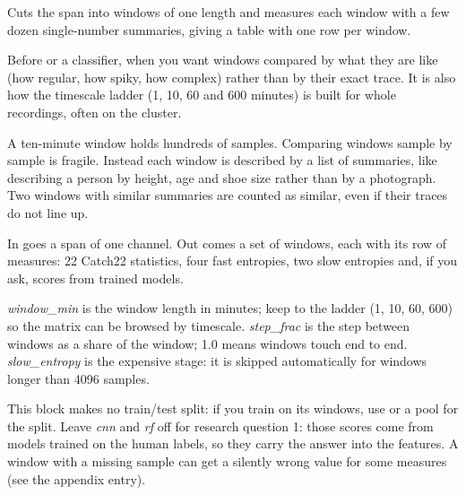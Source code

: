 Cuts the span into windows of one length and measures each window with a few dozen
single-number summaries, giving a table with one row per window.

Before  or a classifier, when you want windows compared by what
they are like (how regular, how spiky, how complex) rather than by their exact trace. It is
also how the timescale ladder (1, 10, 60 and 600 minutes) is built for whole recordings,
often on the cluster.

\begin{plainterms}
A ten-minute window holds hundreds of samples. Comparing windows sample by sample is fragile.
Instead each window is described by a list of summaries, like describing a person by height,
age and shoe size rather than by a photograph. Two windows with similar summaries are
counted as similar, even if their traces do not line up.
\end{plainterms}

In goes a span of one channel. Out comes a set of windows, each with its row of measures:
22 Catch22 statistics, four fast entropies, two slow entropies and, if you ask, scores from
trained models.

\emph{window\_min} is the window length in minutes; keep to the ladder (1, 10, 60, 600) so the
matrix can be browsed by timescale. \emph{step\_frac} is the step between windows as a share
of the window; 1.0 means windows touch end to end. \emph{slow\_entropy} is the expensive
stage: it is skipped automatically for windows longer than 4096 samples.

This block makes no train/test split: if you train on its windows, use
 or a pool for the split. Leave \emph{cnn} and
\emph{rf} off for research question 1: those scores come from models trained on the human
labels, so they carry the answer into the features. A window with a missing sample can get a
silently wrong value for some measures (see the appendix entry).
